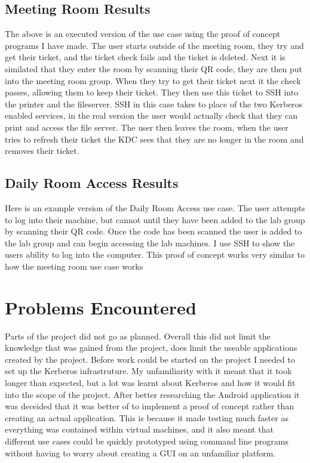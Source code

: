 \documentclass[]{report}   %
\begin{document}
\subsection{Meeting Room Results}
The above is an executed version of the use case using the proof of concept programs I have made. The user starts outside of the meeting room, they try and get their ticket, and the ticket check fails and the ticket is deleted. Next it is similated that they enter the room by scanning their QR code, they are then put into the meeting room group. When they try to get their ticket next it the check passes, allowing them to keep their ticket. They then use this ticket to SSH into the printer and the fileserver. SSH in this case takes to place of the two Kerberos enabled services, in the real version the user would actually check that they can print and access the file server. The user then leaves the room, when the user tries to refresh their ticket the KDC sees that they are no longer in the room and removes their ticket.

\subsection{Daily Room Access Results}
Here is an example version of the Daily Room Access use case. The user attempts to log into their machine, but cannot until they have been added to the lab group by scanning their QR code. Once the code has been scanned the user is added to the lab group and can begin accessing the lab machines. I use SSH to show the users ability to log into the computer. This proof of concept works very similar to how the meeting room use case works





\section{Problems Encountered}
Parts of the project did not go as planned. Overall this did not limit the knowledge that was gained from the project, does limit the useable applications created by the project. Before work could be started on the project I needed to set up the Kerberos infrastruture. My unfamiliarity with it meant that it took longer than expected, but a lot was learnt about Kerberos and how it would fit into the scope of the project. After better researching the Android application it was deceided that it was better of to implement a proof of concept rather than creating an actual application. This is because it made testing much faster as everything was contained within virtual machines, and it also meant that different use cases could be quickly prototyped using command line programs without having to worry about creating a GUI on an unfamiliar platform.
\end{document}
